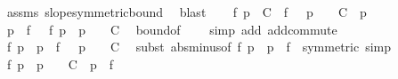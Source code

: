 \begin{isabellebody}
\ assms\ slope{\isacharunderscore}{\kern0pt}symmetric{\isacharunderscore}{\kern0pt}bound\ \isamarkupfalse%
\ blast\isanewline
\isanewline
\ \ \isamarkupfalse%
\ {\isachardoublequoteopen}{\isasymbar}f\ p{\isasymbar}\ {\isasymle}\ {\isacharparenleft}{\kern0pt}C\ {\isacharplus}{\kern0pt}\ {\isasymbar}f\ {}{\isasymbar}{\isacharparenright}{\kern0pt}\ {\isacharasterisk}{\kern0pt}\ {\isasymbar}p{\isasymbar}\ {\isacharplus}{\kern0pt}\ {}\ {\isacharasterisk}{\kern0pt}\ C{\isachardoublequoteclose}\ \ p\isanewline
\ \ \isamarkupfalse%
\ {\isacharminus}{\kern0pt}\isanewline
\ \ \ \ \isamarkupfalse%
\ {\isachardoublequoteopen}{\isasymbar}p\ {\isacharasterisk}{\kern0pt}\ f\ {}\ {\isacharminus}{\kern0pt}\ f\ p{\isasymbar}\ {\isasymle}\ {\isacharparenleft}{\kern0pt}{\isasymbar}p{\isasymbar}\ {\isacharplus}{\kern0pt}\ {}{\isacharparenright}{\kern0pt}\ {\isacharasterisk}{\kern0pt}\ C{\isachardoublequoteclose}\ \isamarkupfalse%
\ bound{\isacharparenleft}{\kern0pt}{}{\isacharparenright}{\kern0pt}{\isacharbrackleft}{\kern0pt}of\ {\isacharunderscore}{\kern0pt}\ {}{\isacharbrackright}{\kern0pt}\ \isamarkupfalse%
\ {\isacharparenleft}{\kern0pt}simp\ add{\isacharcolon}{\kern0pt}\ add{\isachardot}{\kern0pt}commute{\isacharparenright}{\kern0pt}\isanewline
\ \ \ \ \isamarkupfalse%
\ {\isachardoublequoteopen}{\isasymbar}f\ p\ {\isacharminus}{\kern0pt}\ p\ {\isacharasterisk}{\kern0pt}\ f\ {}{\isasymbar}\ {\isasymle}\ {\isacharparenleft}{\kern0pt}{\isasymbar}p{\isasymbar}\ {\isacharplus}{\kern0pt}\ {}{\isacharparenright}{\kern0pt}\ {\isacharasterisk}{\kern0pt}\ C{\isachardoublequoteclose}\ \isamarkupfalse%
\ {\isacharparenleft}{\kern0pt}subst\ abs{\isacharunderscore}{\kern0pt}minus{\isacharbrackleft}{\kern0pt}of\ {\isachardoublequoteopen}f\ p\ {\isacharminus}{\kern0pt}\ p\ {\isacharasterisk}{\kern0pt}\ f\ {}{\isachardoublequoteclose}{\isacharcomma}{\kern0pt}\ symmetric{\isacharbrackright}{\kern0pt}{\isacharcomma}{\kern0pt}\ simp{\isacharparenright}{\kern0pt}\isanewline
\ \ \ \ \isamarkupfalse%
\ {\isachardoublequoteopen}{\isasymbar}f\ p{\isasymbar}\ {\isasymle}\ {\isacharparenleft}{\kern0pt}{\isasymbar}p{\isasymbar}\ {\isacharplus}{\kern0pt}\ {}{\isacharparenright}{\kern0pt}\ {\isacharasterisk}{\kern0pt}\ C\ {\isacharplus}{\kern0pt}\ {\isasymbar}p\ {\isacharasterisk}{\kern0pt}\ f\ {}{\isasymbar}{\isachardoublequoteclose}\ \isamarkupfalse%

\end{isabellebody}
